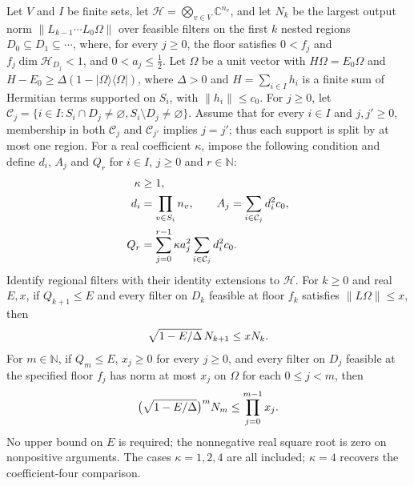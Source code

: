 \begin{theorem}
    \label{thm:first_norm_comparison}
    \leanok
    Let $V$ and $I$ be finite sets, let $\mathcal H=\bigotimes_{v\in V}\mathbb C^{n_v}$,
    and let $N_k$ be the largest output norm $\lVert L_{k-1}\cdots L_0\Omega\rVert$ over feasible
    filters on the first $k$ nested regions $D_0\subseteq D_1\subseteq\cdots$,
    where, for every $j\ge0$, the floor satisfies
    $0<f_j$ and $f_j\dim\mathcal H_{D_j}<1$, and $0<a_j\le\tfrac12$. Let $\Omega$ be a unit vector with
    $H\Omega=E_0\Omega$ and $H-E_0\ge\Delta(1-\lvert\Omega\rangle\langle\Omega\rvert)$,
    where $\Delta>0$ and $H=\sum_{i\in I}h_i$ is a finite sum of Hermitian terms
    supported on $S_i$, with $\lVert h_i\rVert\le c_0$.
    For $j\ge0$, let $\mathcal C_j=\{i\in I:S_i\cap D_j\ne\varnothing,
        S_i\setminus D_j\ne\varnothing\}$. Assume that for every $i\in I$
    and $j,j'\ge0$, membership in both $\mathcal C_j$ and $\mathcal C_{j'}$
    implies $j=j'$; thus each support is split by at most one region.
    For a real coefficient $\kappa$, impose the following condition and
    define $d_i$, $A_j$ and $Q_r$ for $i\in I$, $j\ge0$ and $r\in\mathbb N$:
    \begin{align}
        \kappa & \ge1,\notag                                                            \\
        d_i    & =\prod_{v\in S_i}n_v,\qquad A_j=\sum_{i\in\mathcal C_j}d_i^2c_0,\notag \\
        Q_r    & =\sum_{j=0}^{r-1}\kappa a_j^2\sum_{i\in\mathcal C_j}d_i^2c_0.\notag
    \end{align}
    Identify regional filters with their identity extensions to $\mathcal H$.
    For $k\ge0$ and real $E,x$, if $Q_{k+1}\le E$ and every filter
    on $D_k$ feasible at floor $f_k$ satisfies $\lVert L\Omega\rVert\le x$, then
    \begin{align}
        \sqrt{1-E/\Delta}\,N_{k+1}\le xN_k.\notag
    \end{align}
    For $m\in\mathbb N$, if $Q_m\le E$, $x_j\ge0$ for every $j\ge0$,
    and every filter on $D_j$ feasible at the specified floor $f_j$ has
    norm at most $x_j$ on $\Omega$ for each $0\le j<m$, then
    \begin{align}
        \bigl(\sqrt{1-E/\Delta}\bigr)^mN_m
        \le\prod_{j=0}^{m-1}x_j.\notag
    \end{align}
    No upper bound on $E$ is required; the nonnegative real square root
    is zero on nonpositive arguments. The cases $\kappa=1,2,4$ are all
    included; $\kappa=4$ recovers the coefficient-four comparison.
\end{theorem}
